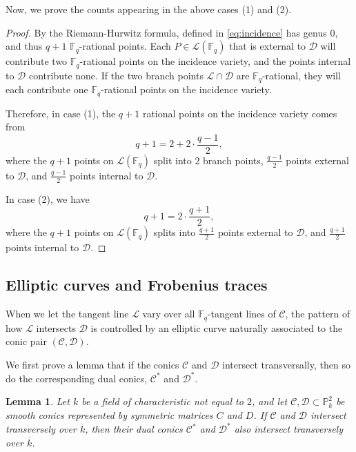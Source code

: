 \documentclass[11pt]{article}
\newtheorem{lem}[defn]{Lemma}  %
\theoremstyle{definition}
\theoremstyle{definition}
\begin{document}
Now, we prove the counts appearing in the above cases (1) and (2). 
\begin{proof}
    By the Riemann-Hurwitz formula, defined in \eqref{eq:incidence} has genus $0$, and thus $q+1$  $\mathbb{F}_q$-rational points. Each $P\in\mathcal{L}(\mathbb{F}_q)$ that is external to $\mathcal{D}$ will contribute two $\mathbb{F}_q$-rational points on the incidence variety, and the points internal to $\mathcal{D}$ contribute none. If the two branch points $\mathcal{L}\cap \mathcal{D}$ are $\mathbb{F}_q$-rational, they will each contribute one $\mathbb{F}_q$-rational points on the incidence variety. 

    Therefore, in case (1), the $q+1$ rational points on the incidence variety comes from 
    $$q+1 = 2 + 2\cdot \frac{q-1}{2},$$
    where the $q+1$ points on $\mathcal{L}(\mathbb{F}_q)$ split into $2$ branch points, $\frac{q-1}{2}$ points external to $\mathcal{D}$, and $\frac{q-1}{2}$ points internal to $\mathcal{D}$. 

    In case (2), we have 
    $$q+1 = 2\cdot \frac{q+1}{2},$$
    where the $q+1$ points on $\mathcal{L}(\mathbb{F}_q)$ splits into $\frac{q+1}{2}$ points external to $\mathcal{D}$, and $\frac{q+1}{2}$ points internal to $\mathcal{D}$. 
\end{proof}

\subsection*{Elliptic curves and Frobenius traces}

When we let the tangent line \(\mathcal L\) vary over all \(\mathbb F_q\)-tangent lines of \(\mathcal C\), the pattern of how \(\mathcal L\) intersects \(\mathcal D\) is controlled by an elliptic curve naturally associated to the conic pair \((\mathcal C,\mathcal D)\).  

We first prove a lemma that if the conics $\mathcal{C}$ and $\mathcal{D}$ intersect transversally, then so do the corresponding dual conics, $\mathcal{C}^*$ and $\mathcal{D^*}$. 
\begin{lem}\label{lem:dual-transversality}
Let \(k\) be a field of characteristic not equal to \(2\), and let
\(\mathcal C,\mathcal D\subset \mathbb P^2_k\) be smooth conics represented by symmetric matrices \(C\) and \(D\). If \(\mathcal C\) and
\(\mathcal D\) intersect transversely over \(\overline{k}\), then their dual
conics \(\mathcal C^*\) and \(\mathcal D^*\) also intersect transversely over
\(\overline{k}\).
\end{lem}
\end{document}
